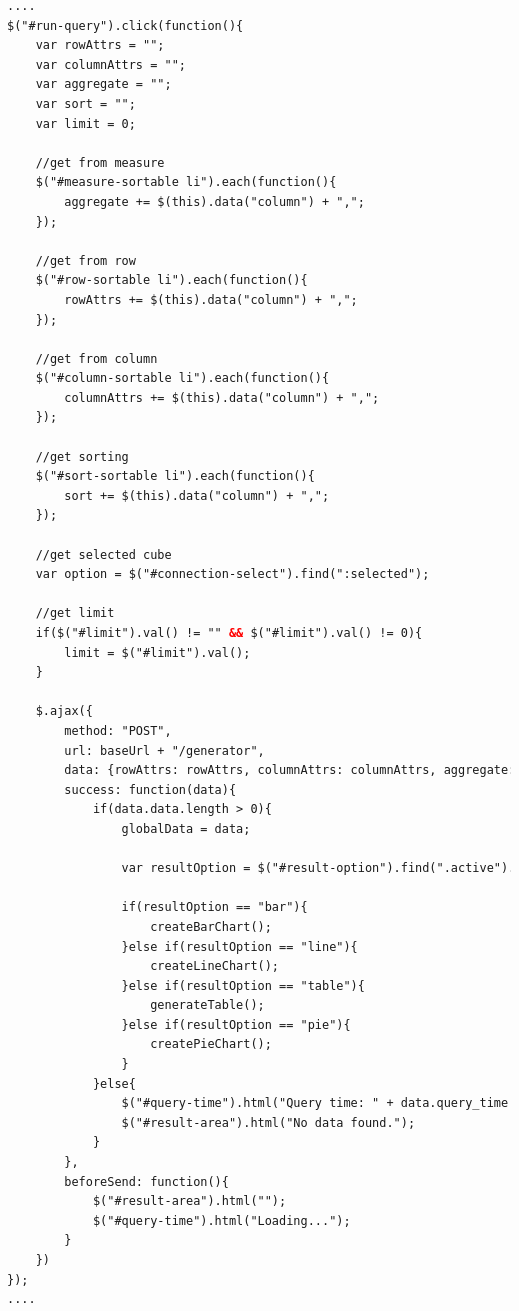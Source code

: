 \begin{lstlisting}[language=HTML,basicstyle=\tiny,caption=script.js (Membuat \textit{request} ke \textit{server} - Laporan dan Analisis),label={lst:kode_bi_client_reporting_1}]
....
$("#run-query").click(function(){
    var rowAttrs = "";
    var columnAttrs = "";
    var aggregate = "";
    var sort = "";
    var limit = 0;

    //get from measure
    $("#measure-sortable li").each(function(){
        aggregate += $(this).data("column") + ",";
    });

    //get from row
    $("#row-sortable li").each(function(){
        rowAttrs += $(this).data("column") + ",";
    });

    //get from column
    $("#column-sortable li").each(function(){
        columnAttrs += $(this).data("column") + ",";
    });

    //get sorting
    $("#sort-sortable li").each(function(){
        sort += $(this).data("column") + ",";
    });

    //get selected cube
    var option = $("#connection-select").find(":selected");

    //get limit
    if($("#limit").val() != "" && $("#limit").val() != 0){
        limit = $("#limit").val();
    }

    $.ajax({
        method: "POST",
        url: baseUrl + "/generator",
        data: {rowAttrs: rowAttrs, columnAttrs: columnAttrs, aggregate: aggregate, condition: $("#filter").val(), having: $("#having").val(), limit: limit, sort: sort, connectionId: option.data("connection"), cubeId: option.data("cube")},
        success: function(data){
       		if(data.data.length > 0){
                globalData = data;

                var resultOption = $("#result-option").find(".active").data("type");

                if(resultOption == "bar"){
                    createBarChart();
                }else if(resultOption == "line"){
                    createLineChart();
                }else if(resultOption == "table"){
                    generateTable();
                }else if(resultOption == "pie"){
                    createPieChart();
                }
            }else{
                $("#query-time").html("Query time: " + data.query_time / 1000 + "s");
                $("#result-area").html("No data found.");
            }
        },
        beforeSend: function(){
            $("#result-area").html("");
            $("#query-time").html("Loading...");
        }
    })
});
....
\end{lstlisting}


